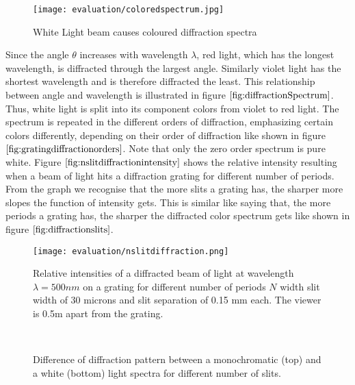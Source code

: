 \begin{figure}[H]
  \centering
  \texttt{[image: evaluation/coloredspectrum.jpg]}
  \caption[Diffracted White Light]{White Light beam causes coloured diffraction spectra}
  \label{fig:diffractionSpectrum}
\end{figure}

Since the angle $\theta$ increases with wavelength $\lambda$, red light, which has the longest wavelength, is diffracted through the largest angle. Similarly violet light has the shortest wavelength and is therefore diffracted the least. This relationship between angle and wavelength is illustrated in figure $\ref{fig:diffractionSpectrum}$. Thus, white light is split into its component colors from violet to red light. The spectrum is repeated in the different orders of diffraction, emphasizing certain colors differently, depending on their order of diffraction like shown in figure $\ref{fig:gratingdiffractionorders}$. Note that only the zero order spectrum is pure white.  
Figure $\ref{fig:nslitdiffractionintensity}$ shows the relative intensity resulting when a beam of light hits a diffraction grating for different number of periods. From the graph we recognise that the more slits a grating has, the sharper more slopes the function of intensity gets. This is similar like saying that, the more periods a grating has, the sharper the diffracted color spectrum gets like shown in figure $\ref{fig:diffractionslits}$. 

\begin{figure}[H]
  \centering
  \texttt{[image: evaluation/nslitdiffraction.png]}
  \caption[Intensity Plots for Different Number of Slits]{Relative intensities of a diffracted beam of light at wavelength $\lambda=500nm$ on a grating for different number of periods $N$ width slit width of 30 microns and slit separation of 0.15 mm each. The viewer is 0.5m apart from the grating.}
  \label{fig:nslitdiffractionintensity}
\end{figure}

\begin{figure}[H]
  \centering

~
  
  
\caption{Difference of diffraction pattern between a monochromatic (top) and a white (bottom) light spectra for different number of slits.}
\label{fig:diffractionslits}
\end{figure}

